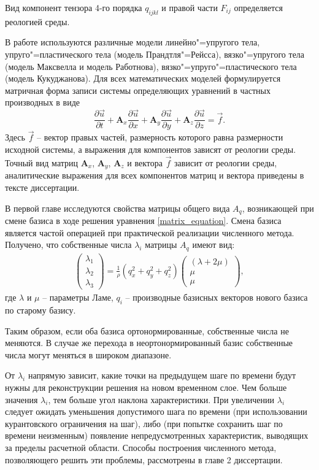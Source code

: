 Вид компонент тензора 4-го порядка $q_{ijkl}$ и правой части $F_{ij}$ определяется реологией среды.

В работе используются различные модели линейно"=упругого тела, упруго"=пластического тела (модель Прандтля"=Рейсса), вязко"=упругого тела (модель Максвелла и модель Работнова), вязко"=упруго"=пластического тела (модель Кукуджанова). Для всех математических моделей формулируется матричная форма записи системы определяющих уравнений в частных производных в виде
\begin{equation}
\label{matrix_equation}
\frac{\partial\vec{u}}{\partial{t}}+\mathbf{A}_x\frac{\partial\vec{u}}{\partial{x}}+
\mathbf{A}_y\frac{\partial\vec{u}}{\partial{y}}+
\mathbf{A}_z\frac{\partial\vec{u}}{\partial{z}}=\vec{f}.
\end{equation}
Здесь $\vec{f}$ -- вектор правых частей, размерность которого равна размерности исходной системы, а выражения для компонентов зависят от реологии среды. Точный вид матриц $\mathbf{A}_x$, $\mathbf{A}_y$, $\mathbf{A}_z$ и вектора $\vec{f}$ зависит от реологии среды, аналитические выражения для всех компонентов матриц и вектора приведены в тексте диссертации.

В первой главе исследуются свойства матрицы общего вида $A_q$, возникающей при смене базиса в ходе решения уравнения \eqref{matrix_equation}. Смена базиса является частой операцией при практической реализации численного метода. Получено, что собственные числа $\lambda_i$ матрицы $A_q$ имеют вид:
\begin{align}
\left( \begin{array}{cccccccccccc}
\lambda_1 \\
\lambda_2 \\
\lambda_3 
\end{array} \right) = 
\frac 1 \rho (q_x^2 + q_y^2 + q_z^2)
\left( \begin{array}{cccccccccccc}
(\lambda+2\mu) \\
\mu \\
\mu  
\end{array} \right),
\end{align} 
где $\lambda$ и $\mu$ -- параметры Ламе, $q_i$ -- производные базисных векторов нового базиса по старому базису.

Таким образом, если оба базиса ортонормированные, собственные числа не меняются. В случае же перехода в неортонормированный базис собственные числа могут меняться в широком диапазоне.

От $\lambda_i$ напрямую зависит, какие точки на предыдущем шаге по времени будут нужны для реконструкции решения на новом временном слое. Чем больше значения $\lambda_i$, тем больше угол наклона характеристики. При увеличении $\lambda_i$ следует ожидать уменьшения допустимого шага по времени (при использовании курантовского ограничения на шаг), либо (при попытке сохранить шаг по времени неизменным) появление непредусмотренных характеристик, выводящих за пределы расчетной области. Способы построения численного метода, позволяющего решить эти проблемы, рассмотрены в главе 2 диссертации.

